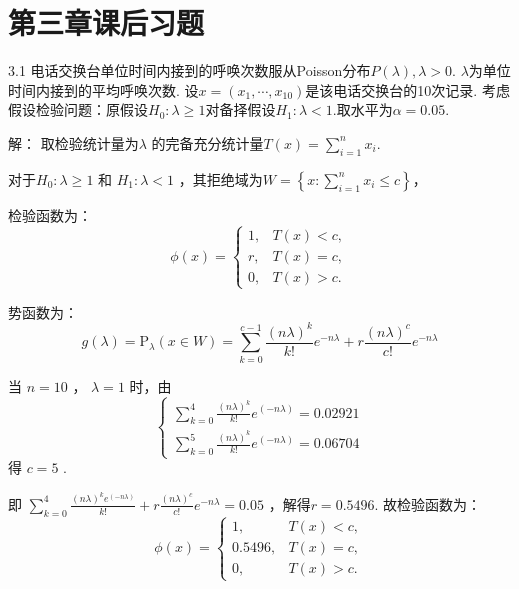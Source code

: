 \section{第三章课后习题}
\begin{example}
    3.1 电话交换台单位时间内接到的呼唤次数服从Poisson分布$ P(\lambda) , \lambda>0 .$ $\lambda $为单位时间内接到的平均呼唤次数. 设$ x=(x_1,\cdots,x_{10}) $是该电话交换台的10次记录. 考虑假设检验问题：原假设$ H_{0}: \lambda \geqslant 1 $对备择假设$ H_{1}: \lambda<1 . $取水平为$ \alpha=0.05 .$

    解：
    取检验统计量为$ \lambda$ 的完备充分统计量$ T(x)=\sum_{i=1}^{n} x_{i} .$

    对于$ H_{0}: \lambda \geqslant 1$ 和 $H_{1}: \lambda<1$ ，其拒绝域为$ W=\left\{x: \sum_{i=1}^{n} x_{i} \leqslant c\right\} $，

    检验函数为：
    \[
        \phi(x)=\left\{\begin{array}{ll}1, & T(x)<c, \\ r, & T(x)=c, \\ 0, & T(x)>c.\end{array}\right.
    \]

    势函数为： 
    \[
        g(\lambda)=\text{P}_{\lambda}(x \in W)=\sum_{k=0}^{c-1} \frac{(n\lambda)^k}{k !}e^{-n\lambda}+r \frac{(n\lambda)^{c}}{c!} e^{-n \lambda}
    \]

    当 $n=10$ ， $\lambda=1$ 时，由 
    \[
        \left\{\begin{array}{l}\sum_{k=0}^{4} \frac{(n \lambda)^{k} }{k !}e^{(-n\lambda)}=0.02921 \\ \sum_{k=0}^{5} \frac{(n \lambda)^{k}}{k !}e^{(-n\lambda)}=0.06704 \end{array}\right.
    \]
    得 $c=5$ .

    即 $\sum_{k=0}^{4} \frac{(n \lambda)^{k} e^{(-n \lambda)}}{k !}+r \frac{(n \lambda)^{c}}{c !} e^{-n \lambda}=0.05$ ，解得$ r=0.5496 .$
    故检验函数为： 
    \[
    \phi(x)=\left\{\begin{array}{ll}1, & T(x)<c, \\ 0.5496, & T(x)=c, \\ 0, & T(x)>c.\end{array}\right. 
    \]
\end{example}